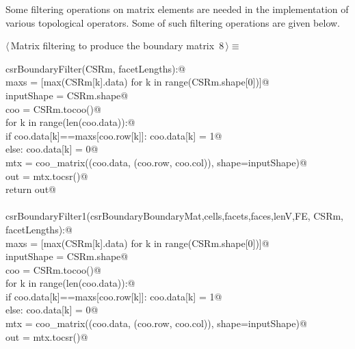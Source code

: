 \documentclass[11pt,oneside]{article}	%
\begin{document}
Some filtering operations on matrix elements are needed in the implementation of various topological operators. Some of such filtering operations are given below.

\begin{flushleft} \small \label{scrap14}
\protect{}$\langle\,$Matrix filtering to produce the boundary matrix\nobreak\ {\footnotesize 8}$\,\rangle\equiv$
\vspace{-1ex}
\begin{list}{}{} \item
\mbox{}\verb@def csrBoundaryFilter(CSRm, facetLengths):@\\
\mbox{}\verb@   maxs = [max(CSRm[k].data) for k in range(CSRm.shape[0])]@\\
\mbox{}\verb@   inputShape = CSRm.shape@\\
\mbox{}\verb@   coo = CSRm.tocoo()@\\
\mbox{}\verb@   for k in range(len(coo.data)):@\\
\mbox{}\verb@      if coo.data[k]==maxs[coo.row[k]]: coo.data[k] = 1@\\
\mbox{}\verb@      else: coo.data[k] = 0@\\
\mbox{}\verb@   mtx = coo_matrix((coo.data, (coo.row, coo.col)), shape=inputShape)@\\
\mbox{}\verb@   out = mtx.tocsr()@\\
\mbox{}\verb@   return out@\\
\mbox{}\verb@@\\
\mbox{}\verb@def csrBoundaryFilter1(csrBoundaryBoundaryMat,cells,facets,faces,lenV,FE, CSRm, facetLengths):@\\
\mbox{}\verb@   maxs = [max(CSRm[k].data) for k in range(CSRm.shape[0])]@\\
\mbox{}\verb@   inputShape = CSRm.shape@\\
\mbox{}\verb@   coo = CSRm.tocoo()@\\
\mbox{}\verb@   for k in range(len(coo.data)):@\\
\mbox{}\verb@      if coo.data[k]==maxs[coo.row[k]]: coo.data[k] = 1@\\
\mbox{}\verb@      else: coo.data[k] = 0@\\
\mbox{}\verb@   mtx = coo_matrix((coo.data, (coo.row, coo.col)), shape=inputShape)@\\
\mbox{}\verb@   out = mtx.tocsr()@\\

\end{list}
\end{flushleft}
\end{document}

